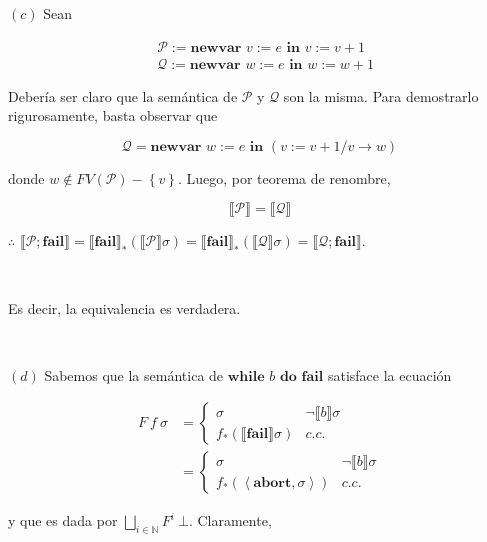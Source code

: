 \documentclass[a4paper, 12pt]{article}
\begin{document}
$(c)$ Sean

\begin{align*}
  &\mathcal{P} := \textbf{newvar } v := e \textbf{ in } v := v+1
  \\
  &\mathcal{Q} := \textbf{newvar } w := e \textbf{ in } w := w+1
\end{align*}

Debería ser claro que la semántica de $\mathcal{P}$ y $\mathcal{Q}$ son la
misma. Para demostrarlo rigurosamente, basta observar que 

\begin{equation*}
  \mathcal{Q} = \textbf{newvar } w := e \textbf{ in } (v := v + 1 / v \to w)
\end{equation*}

donde $w \not\in FV(\mathcal{P}) - \left\{ v \right\} $. Luego, por teorema de
renombre, 

\begin{equation*}
  \llbracket \mathcal{P} \rrbracket = \llbracket \mathcal{Q} \rrbracket
\end{equation*}

$\therefore $ $\llbracket \mathcal{P};\textbf{fail} \rrbracket = \llbracket
\textbf{fail} \rrbracket_* \left( \llbracket \mathcal{P} \rrbracket\sigma
\right) = \llbracket \textbf{fail} \rrbracket_* \left( \llbracket \mathcal{Q}
\rrbracket\sigma \right) = \llbracket \mathcal{Q};\textbf{fail} \rrbracket$.

~

Es decir, la equivalencia es verdadera.


~ 

$(d)$ Sabemos que la semántica de $\textbf{while } b \textbf{ do }
\textbf{fail}$ satisface la ecuación 

\begin{align*}
  F ~ f ~ \sigma 
  &= \begin{cases}
    \sigma & \neg \llbracket b \rrbracket\sigma \\ 
    f_*\left( \llbracket \textbf{fail} \rrbracket\sigma \right) &c.c.
  \end{cases} \\ 
  &=\begin{cases}
    \sigma & \neg \llbracket b \rrbracket\sigma \\ 
    f_* \left( \left<\textbf{abort}, \sigma \right> \right) & c.c.
  \end{cases}
\end{align*}

y que es dada por $\bigsqcup_{i \in \mathbb{N}} F^i ~ \bot $. Claramente, 
\end{document}
